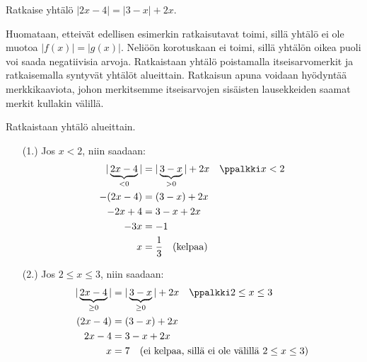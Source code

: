 \begin{esimerkki}
Ratkaise yhtälö $|2x-4|=|3-x|+2x$.

\begin{esimratk}
Huomataan, etteivät edellisen esimerkin ratkaisutavat toimi, sillä yhtälö ei ole muotoa $|f(x)|=|g(x)|$. Neliöön korotuskaan ei toimi, sillä yhtälön oikea puoli voi saada negatiivisia arvoja. Ratkaistaan yhtälö poistamalla itseisarvomerkit ja ratkaisemalla syntyvät yhtälöt alueittain. Ratkaisun apuna voidaan hyödyntää merkkikaaviota, johon merkitsemme itseisarvojen sisäisten lausekkeiden saamat merkit kullakin välillä.

\begin{lukusuora}{0}{4}{4}
\end{lukusuora}
\begin{lukusuora}{1}{5}{4}
\end{lukusuora}

\begin{center}
\begin{merkkikaavio}{2}

	\merkkikaavioMerkki{$-$}
	\merkkikaavioMerkki{$+$}
	\merkkikaavioMerkki{$+$}

\merkkikaavioUusirivi
	\merkkikaavioMerkki{$+$}
	\merkkikaavioMerkki{$+$}
	\merkkikaavioMerkki{$-$}

\end{merkkikaavio}
\end{center}

Ratkaistaan yhtälö alueittain.
\begin{itemize}
\item[(1.)] Jos $x<2$, niin saadaan:
\begin{align*}
|\underbrace{2x-4}_{<0}|&=|\underbrace{3-x}_{>0}|+2x \quad \ppalkki x<2  \\
-(2x-4)&=(3-x)+2x \\
-2x+4&=3-x+2x \\
-3x &= -1 \\
x &= \frac{1}{3} \quad \text{(kelpaa)}
\end{align*}

\item[(2.)] Jos $2\leq x\leq 3$, niin saadaan:
\begin{align*}
	|\underbrace{2x-4}_{\geq0}|&=|\underbrace{3-x}_{\geq0}|+2x \quad \ppalkki 2\leq x\leq 3  \\
	(2x-4)&=(3-x)+2x \\
	2x-4&=3-x+2x \\
	x &= 7 \quad \text{(ei kelpaa, sillä ei ole välillä $2\leq x\leq 3$)}
\end{align*}


\end{itemize}
\end{esimratk}
\end{esimerkki}
